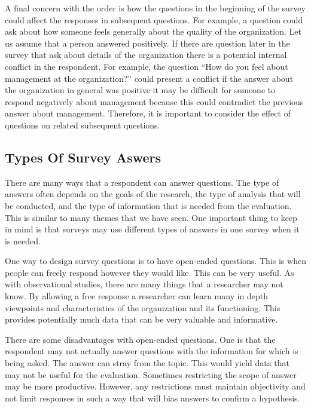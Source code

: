 \documentclass[]{book}
\theoremstyle{definition}
\theoremstyle{definition}
\theoremstyle{definition}
\theoremstyle{remark}
\begin{document}
A final concern with the order is how the questions in the beginning of
the survey could affect the responses in subsequent questions. For
example, a question could ask about how someone feels generally about
the quality of the organization. Let us assume that a person answered
positively. If there are question later in the survey that ask about
details of the organization there is a potential internal conflict in
the respondent. For example, the question ``How do you feel about
management at the organization?'' could present a conflict if the answer
about the organization in general was positive it may be difficult for
someone to respond negatively about management because this could
contradict the previous answer about management. Therefore, it is
important to consider the effect of questions on related subsequent
questions.

\hypertarget{types-of-survey-aswers}{%
\subsection{Types Of Survey Aswers}\label{types-of-survey-aswers}}

There are many ways that a respondent can answer questions. The type of
answers often depends on the goals of the research, the type of analysis
that will be conducted, and the type of information that is needed from
the evaluation. This is similar to many themes that we have seen. One
important thing to keep in mind is that surveys may use different types
of answers in one survey when it is needed.

One way to design survey questions is to have open-ended questions. This
is when people can freely respond however they would like. This can be
very useful. As with observational studies, there are many things that a
researcher may not know. By allowing a free response a researcher can
learn many in depth viewpoints and characteristics of the organization
and its functioning. This provides potentially much data that can be
very valuable and informative.

There are some disadvantages with open-ended questions. One is that the
respondent may not actually answer questions with the information for
which is being asked. The answer can stray from the topic. This would
yield data that may not be useful for the evaluation. Sometimes
restricting the scope of answer may be more productive. However, any
restrictions must maintain objectivity and not limit responses in such a
way that will bias answers to confirm a hypothesis.
\end{document}
